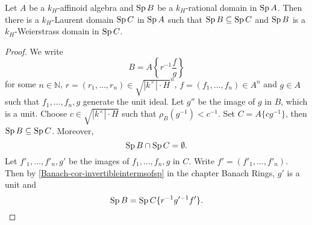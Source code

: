 \begin{proposition}\label{prop-rationaldomaindecomp}
    Let $A$ be a $k_H$-affinoid algebra and $\operatorname{Sp} B$ be a $k_H$-rational domain in $\operatorname{Sp} A$. Then there is a $k_H$-Laurent domain $\operatorname{Sp} C$ in $\operatorname{Sp} A$ such that $\operatorname{Sp} B\subseteq \operatorname{Sp} C$ and $\operatorname{Sp} B$ is a $k_H$-Weierstrass domain in $\operatorname{Sp} C$.
\end{proposition}
\begin{proof}
    We write 
    \[
        B=A\left\{r^{-1}\frac{f}{g}\right\}  
    \]
    for some $n\in \mathbb{N}$, $r=(r_1,\ldots,r_n)\in \sqrt{|k^{\times}|\cdot H}^n$, $f=(f_1,\ldots,f_n)\in A^n$ and $g\in A$ such that $f_1,\ldots,f_n,g$ generate the unit ideal. Let $g''$ be the image of $g$ in $B$, which is a unit. Choose $c\in \sqrt{|k^{\times}|\cdot H}$ such that $\rho_B(g^{-1})<c^{-1}$. Set $C=A\{c g^{-1}\}$, then $\operatorname{Sp} B\subseteq \operatorname{Sp} C$. Moreover,
    \[
        \operatorname{Sp} B\cap \operatorname{Sp} C=\emptyset.  
    \]
    Let $f'_1,\ldots,f'_n,g'$ be the images of $f_1,\ldots,f_n,g$ in $C$. Write $f'=(f'_1,\ldots,f'_n)$. Then by \cref{Banach-cor-invertibleintermsofsp} in the chapter Banach Rings, $g'$ is a unit and 
    \[
        \operatorname{Sp} B=\operatorname{Sp} C\{r^{-1} g'^{-1}f'\}.  
    \]
\end{proof}

